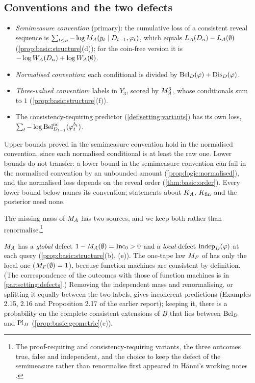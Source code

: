 \subsection{Conventions and the two defects}\label{sec:setting:conventions}

\begin{definition}\label{def:setting:conventions}
\begin{itemize}[leftmargin=*]
\item \emph{Semimeasure convention} (primary): the cumulative loss of a consistent reveal sequence is $\sum_{t\le n}-\log M_{A}(y_t\mid D_{t-1},\varphi_t)$, which equals $L_{A}(D_n)-L_{A}(\emptyset)$ (\cref{prop:basic:structure}(d)); for the coin-free version it is $-\log W_{A}(D_n)+\log W_{A}(\emptyset)$.
\item \emph{Normalised convention}: each conditional is divided by $\mathrm{Bel}_D(\varphi)+\mathrm{Dis}_D(\varphi)$.
\item \emph{Three-valued convention}: labels in $Y_3$, scored by $M_{A}^{3}$, whose conditionals sum to $1$ (\cref{prop:basic:structure}(f)).
\item The consistency-requiring predictor (\cref{def:setting:variants}) has its own loss, $\sum_t-\log\mathrm{Bel}^{\mathrm{nc}}_{D_{t-1}}(\varphi_t^{b_t})$.
\end{itemize}
\end{definition}

Upper bounds proved in the semimeasure convention hold in the normalised convention, since each normalised conditional is at least the raw one. Lower bounds do not transfer: a lower bound in the semimeasure convention can fail in the normalised convention by an unbounded amount (\cref{prop:logic:normalised}), and the normalised loss depends on the reveal order (\cref{thm:basic:order}). Every lower bound below names its convention; statements about $K_{A}$, $K_{\mathrm{fin}}$ and the posterior need none.

The missing mass of $M_{A}$ has two sources, and we keep both rather than renormalise.\footnote{The proof-requiring and consistency-requiring variants, the three outcomes true, false and independent, and the choice to keep the defect of the semimeasure rather than renormalise first appeared in H\"anni's working notes \citep{hanni2026notes}.}

\begin{remark}\label{rem:setting:defects}
$M_{A}$ has a \emph{global} defect $1-M_{A}(\emptyset)=\mathrm{Inc}_0>0$ and a \emph{local} defect $\mathrm{Indep}_D(\varphi)$ at each query (\cref{prop:basic:structure}(b), (e)). The one-tape law $M_{F}$ of \SOIabbr has only the local one ($M_{F}(\emptyset)=1$), because function machines are consistent by definition. (The correspondence of the outcomes with those of function machines is in \cref{par:setting:defects}.) Removing the independent mass and renormalising, or splitting it equally between the two labels, gives incoherent predictions (Examples 2.15, 2.16 and Proposition 2.17 of the earlier report); keeping it, there is a probability on the complete consistent extensions of $B$ that lies between $\mathrm{Bel}_D$ and $\mathrm{Pl}_D$ (\cref{prop:basic:geometric}(c)).
\end{remark}

